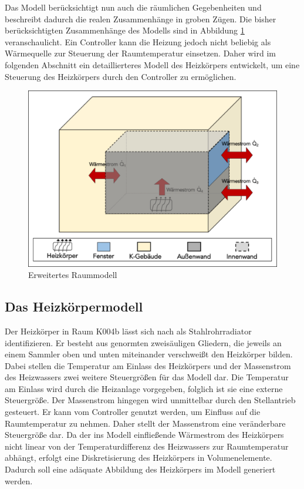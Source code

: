 Das Modell berücksichtigt nun auch die räumlichen Gegebenheiten und beschreibt dadurch die realen Zusammenhänge in groben Zügen. Die bisher berücksichtigten Zusammenhänge des Modells sind in Abbildung \ref{fig:raumeins} veranschaulicht. Ein Controller kann die Heizung jedoch nicht beliebig als Wärmequelle zur Steuerung der Raumtemperatur einsetzen. Daher wird im folgenden Abschnitt ein detaillierteres Modell des Heizkörpers entwickelt, um eine Steuerung des Heizkörpers durch den Controller zu ermöglichen. 

\begin{figure}
\centering
\includegraphics[width=\textwidth]{abbildungen/20160316_raumeins}
\caption{Erweitertes Raummodell}
\label{fig:raumeins}
\end{figure}



\subsection{Das Heizkörpermodell}

Der Heizkörper in Raum K004b lässt sich nach \cite[S.~824f.]{re14} als Stahlrohrradiator identifizieren. Er besteht aus genormten zweisäuligen Gliedern, die jeweils an einem Sammler oben und unten miteinander verschweißt den Heizkörper bilden. Dabei stellen die Temperatur am Einlass des Heizkörpers und der Massenstrom des Heizwassers zwei weitere Steuergrößen für das Modell dar. Die Temperatur am Einlass wird durch die Heizanlage vorgegeben, folglich ist sie eine externe Steuergröße. Der Massenstrom hingegen wird unmittelbar durch den Stellantrieb gesteuert. Er kann vom Controller genutzt werden, um Einfluss auf die Raumtemperatur zu nehmen. Daher stellt der Massenstrom eine veränderbare Steuergröße dar. Da der ins Modell einfließende Wärmestrom des Heizkörpers nicht linear von der Temperaturdifferenz des Heizwassers zur Raumtemperatur abhängt, erfolgt eine Diskretisierung des Heizkörpers in Volumenelemente. Dadurch soll eine adäquate Abbildung des Heizkörpers im Modell generiert werden. 

